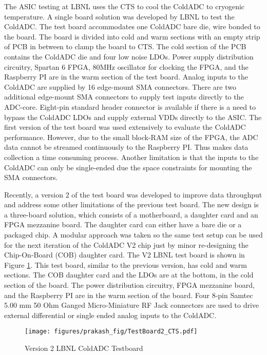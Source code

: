 \label{sec:2.4}
The ASIC testing at LBNL uses the CTS to cool the ColdADC to cryogenic temperature. A single board solution was 
developed by LBNL to test the ColdADC. The test board accommodates one ColdADC bare die, wire bonded to the board. 
The board is divided into cold and warm sections with an empty strip of PCB in between to clamp the board to CTS.
The cold section of the PCB contains the ColdADC die and four low noise LDOs.
Power supply distribution circuitry, Spartan 6 FPGA,  80MHz oscillator for clocking 
the FPGA, and the Raspberry PI are in the warm section of the test board. Analog inputs to 
the ColdADC are supplied by 16 edge-mount SMA connectors. There are two additional edge-mount SMA connectors 
to supply test inputs directly to the ADC-core. Eight-pin standard header connector is available if there is 
a need to bypass the ColdADC LDOs and supply external VDDs directly to the ASIC.
The first version of the test board was used extensively to evaluate the ColdADC performance.  However, due to the small 
block-RAM size of the FPGA, the ADC data cannot be streamed continuously to the Raspberry PI. Thus makes
data collection a time consuming process. Another limitation is that the inputs to the ColdADC can only be single-ended due 
the space constraints for mounting the SMA connectors.

Recently, a version 2 of the test board was developed to improve data throughput and address some other limitations 
of the previous test board.  The new design is a three-board 
solution, which consists of a motherboard, a daughter card and an FPGA mezzanine board. The daughter card can either have a 
bare die or a packaged chip. A modular approach was taken so the same test setup 
can be used for the next iteration of the ColdADC V2 chip just by minor re-designing the Chip-On-Board (COB) daughter card. The V2 LBNL 
test board is shown in Figure \ref{fig:v2_board}. This test board, similar to the previous version, has cold and warm 
sections. The COB daughter card and the LDOs are at the bottom, in the cold section of the board. The power 
distribution circuitry, FPGA mezzanine board, and the Raspberry PI are in the warm section of the board. 
Four 8-pin Samtec 5.00 mm 50 Ohm Ganged Micro-Miniature RF Jack connectors are used to drive external 
differential or single ended analog inputs to the ColdADC.  

\begin{figure}[!ht]
\centering
 \texttt{[image: figures/prakash\_fig/TestBoard2\_CTS.pdf]}
  \caption[LBNL ColdADC Testboard]{Version 2 LBNL ColdADC Testboard}
  \label{fig:v2_board}
\end{figure}


